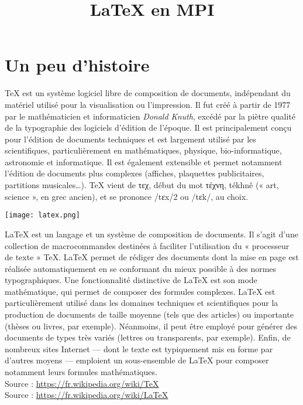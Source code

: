 \documentclass{cs-mpi}
\begin{document}
\title{\LaTeX{} en MPI}
\section{Un peu d'histoire}
%
\TeX{} est un système logiciel libre de composition de documents, indépendant du matériel utilisé pour la visualisation ou l'impression. Il fut créé à partir de 1977 par le mathématicien et informaticien \emph{Donald Knuth}, excédé par la piètre qualité de la typographie des logiciels d'édition de l'époque. Il est principalement conçu pour l'édition de documents techniques et est largement utilisé par les scientifiques, particulièrement en mathématiques, physique, bio-informatique, astronomie et informatique. Il est également extensible et permet notamment l'édition de documents plus complexes (affiches, plaquettes publicitaires, partitions musicales\dots). 
\TeX{} vient de τεχ, début du mot τέχνη, tékhnê (« art, science », en grec ancien), et se prononce /tɛx/2 ou /tɛk/, au choix.
\begin{center}
\texttt{[image: latex.png]}
\end{center}
\LaTeX{}  est un langage et un système de composition de documents. Il s'agit d'une collection de macrocommandes destinées à faciliter l'utilisation du « processeur de texte » \TeX{}.
\LaTeX{} permet de rédiger des documents dont la mise en page est réalisée automatiquement en se conformant du mieux possible à des normes typographiques. Une fonctionnalité distinctive de LaTeX est son mode mathématique, qui permet de composer des formules complexes.
\LaTeX{} est particulièrement utilisé dans les domaines techniques et scientifiques pour la production de documents de taille moyenne (tels que des articles) ou importante (thèses ou livres, par exemple). Néanmoins, il peut être employé pour générer des documents de types très variés (lettres ou transparents, par exemple). Enfin, de nombreux sites Internet — dont le texte est typiquement mis en forme par d’autres moyens — emploient un sous-ensemble de LaTeX pour composer notamment leurs formules mathématiques. 
\\[2mm]
Source : \url{https://fr.wikipedia.org/wiki/TeX}
\\
Source : \url{https://fr.wikipedia.org/wiki/LaTeX}
\end{document}
